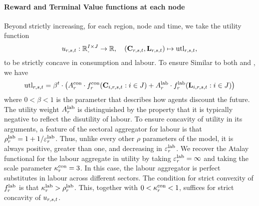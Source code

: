 \documentclass[12pt,a4paper,twoside, draft]{article}
\begin{document}
\paragraph{Reward and Terminal Value functions at each node}
Beyond strictly increasing, for each region, node and time, we take the utility
function
\[
u_{r, \node, t}: \nnreal^{I \times J} \rightarrow \R, \quad
  (\mathbf{C}_{r, \node, t}, \mathbf{L}_{r, \node, t})
    \mapsto \textup{utl}_{r, \node, t},
\]
 to be strictly concave in consumption and labour.
To ensure 
Similar to both \citet{Atalay-Sectoral_shocks} and \citet{CJ}, we have
\begin{equation}
  \textup{utl}_{r, {s}, t}
    = \beta^{t}
      \cdot \left(
        A_{r}^\textup{con}
          \cdot f_{r}^{\textup{con}}(\mathbf{C}_{i, r, {s}, t}: i \in J)
        + A_{r}^{\textup{lab}}
          \cdot f_{r}^{{\textup{lab}}}(\mathbf{L}_{i, r, {s}, t}: i \in J)
      \right)
\end{equation}
where $0 < \beta < 1$ is the parameter that describes how agents discount
the future.
The utility weight $A_{r}^{{\textup{lab}}}$ is distinguished by the property that
it is typically negative to reflect the disutility of labour.
To ensure concavity of utility in its arguments, a feature of the sectoral
aggregator for labour is that 
$\rho_{r}^{{\textup{lab}}} = 1 + 1 / \varepsilon_{r}^{{\textup{lab}}}$.
Thus, unlike every other $\rho$ parameters of the model, it is always
positive, greater than one, and decreasing in $\varepsilon_{r}^{\textup{lab}}$.
We recover the Atalay functional for the labour aggregate in utility by taking
$\varepsilon_{r}^{\textup{lab}} = \infty$ and taking the scale parameter
$\kappa_{r}^\textup{con} = 3$.
In this case, the labour aggregator is perfect substitutes in labour across
different sectors.
The condition for strict convexity of $f_{r}^{\textup{lab}}$
is that $\kappa_{r}^{\textup{lab}} > \rho_{r}^{\textup{lab}}$.
This, together with $0 <\kappa_{r}^{\textup{con}} < 1$, suffices for strict
concavity of $u_{r, {s}, t}$.
\end{document}
